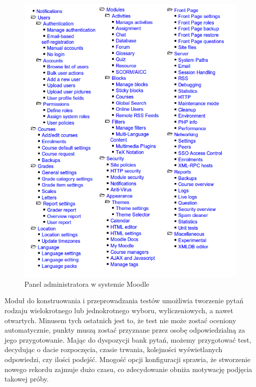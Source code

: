 \documentclass[12pt,twoside]{report}
\begin{document}
\begin{figure}[ht]
  \begin{center}
    \includegraphics[width=1\linewidth]{images/moodle_panel.png}
  \end{center}
  \caption{Panel administratora w systemie Moodle}
  \label{fig:moodle_panel}
\end{figure}


Moduł do konstruowania i przeprowadzania testów umożliwia tworzenie pytań rodzaju
wielokrotnego lub jednokrotnego wyboru, wyliczeniowych, a nawet otwartych. Minusem tych
ostatnich jest to, że test nie może zostać oceniony automatycznie, punkty muszą zostać
przyznane przez osobę odpowiedzialną za jego przygotowanie. Mając do dyspozycji bank
pytań, możemy przygotować test, decydując o dacie rozpoczęcia, czasie trwania, kolejności
wyświetlanych odpowiedzi, czy ilości podejść. Mnogość opcji konfiguracji sprawia, że
stworzenie nowego rekordu zajmuje dużo czasu, co zdecydowanie obniża motywację podjęcia
takowej próby.
\end{document}
